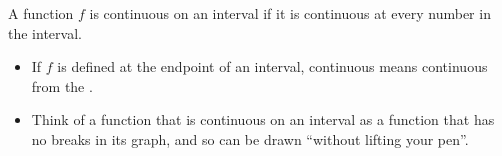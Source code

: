 \begin{frame}
\begin{definition}
A function $f$ is continuous on an interval if it is continuous at every number in the interval.
\end{definition}
\begin{itemize}

\item<2-> If $f$ is defined at the   endpoint of an interval, continuous means continuous from the  . 
\item<4->{
Think of a function that is continuous on an interval as a function that has no breaks in its graph, and so can be drawn ``without lifting your pen''.
}
\end{itemize}


\end{frame}
